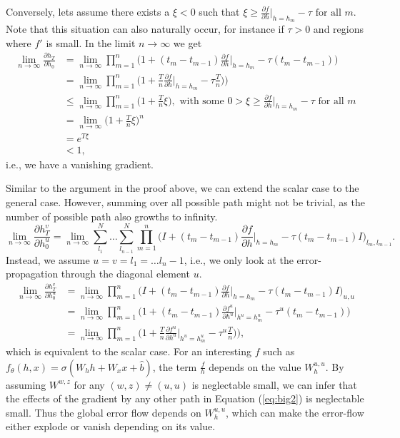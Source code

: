 \documentclass{article}
\begin{document}
Conversely, lets assume there exists a $\xi<0$ such that  $\xi \geq \frac{\partial f}{\partial h}\Big|_{h=h_{m}} - \tau\text { for all }m$. Note that this situation can also naturally occur, for instance if $\tau>0$ and regions where $f'$ is small.
In the limit $n\rightarrow \infty$ we get
\begin{align*}
\lim_{n\rightarrow \infty} \frac{\partial h_{T}}{\partial h_{0}} & = \lim_{n\rightarrow \infty}  \prod_{m=1}^{n}\Big( 1 + (t_m-t_{m-1}) \frac{\partial f}{\partial h}\Big|_{h=h_{m}} - \tau (t_m-t_{m-1}) \Big)\\
&=  \lim_{n\rightarrow \infty}  \prod_{m=1}^{n}\Big( 1 + \frac{T}{n} \frac{\partial f}{\partial h}\Big|_{h=h_{m}} - \tau \frac{T}{n}) \Big)\\
&\leq  \lim_{n\rightarrow \infty}  \prod_{m=1}^{n}\Big( 1 + \frac{T}{n} \xi \Big), \text{  with some  } 0 > \xi \geq \frac{\partial f}{\partial h}\Big|_{h=h_{m}} - \tau\text { for all }m\\
&=  \lim_{n\rightarrow \infty}  \Big( 1 + \frac{T}{n} \xi \Big)^n \\
& = e^{T\xi}\\
& < 1,
\end{align*}
i.e., we have a vanishing gradient.

Similar to the argument in the proof above, we can extend the scalar case to the general case.
However, summing over all possible path might not be trivial, as the number of possible path also growths to infinity.
\begin{equation}\label{eq:big2}
\lim_{n\rightarrow \infty} \frac{\partial h^v_{T}}{\partial h^u_{0}} = \lim_{n\rightarrow \infty}  \sum_{l_1}^{N} \dots \sum_{l_{n-1}}^{N} \prod_{m=1}^{n}\Big( I + (t_m-t_{m-1}) \frac{\partial f}{\partial h}\Big|_{h=h_{m}} - \tau (t_m-t_{m-1}) I \Big)_{l_m,l_{m-1}}.
\end{equation}
Instead, we assume $u=v=l_1=\dots l_n-1$, i.e., we only look at the error-propagation through the diagonal element $u$.
\begin{align*}
\lim_{n\rightarrow \infty} \frac{\partial h^v_{T}}{\partial h^u_{0}} &= \lim_{n\rightarrow \infty}  \prod_{m=1}^{n}\Big( I + (t_m-t_{m-1})\frac{\partial f}{\partial h}\Big|_{h=h_{m}} - \tau (t_m-t_{m-1}) I \Big)_{u,u}\\
 & = \lim_{n\rightarrow \infty}  \prod_{m=1}^{n}\Big( 1 + (t_m-t_{m-1}) \frac{\partial f^u}{\partial h^u}\Big|_{h^u=h^u_{m}} - \tau^u (t_m-t_{m-1}) \Big)\\
&=  \lim_{n\rightarrow \infty}  \prod_{m=1}^{n}\Big( 1 + \frac{T}{n} \frac{\partial f^u}{\partial h^u}\Big|_{h^u=h^u_{m}} - \tau^u \frac{T}{n}) \Big),
\end{align*}
which is equivalent to the scalar case.
For an interesting $f$ such as $f_{\theta}(h,x) = \sigma(W_h h + W_x x + \hat{b})$, the term $\frac{f}{h}$ depends on the value $W^{u,u}_h$.
By assuming $W^{w,z}$ for any $(w,z)\neq (u,u)$ is neglectable small, we can infer that the effects of the gradient by any other path in Equation (\ref{eq:big2}) is neglectable small. Thus the global error flow depends on $W^{u,u}_h$, which can make the error-flow either explode or vanish depending on its value.
\end{document}
